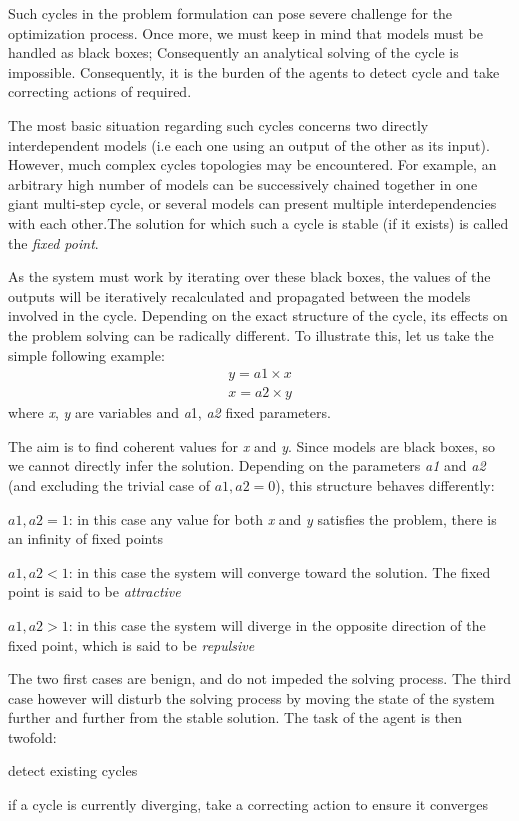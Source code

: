 Such cycles in the problem formulation can pose severe challenge for the optimization process. Once more, we must keep in mind that models must be handled as black boxes; Consequently an analytical solving of the cycle is impossible. Consequently, it is the burden of the agents to detect cycle and take correcting actions of required.

The most basic situation regarding such cycles concerns two directly interdependent models (i.e each one using an output of the other as its input). However, much complex cycles topologies may be encountered. For example, an arbitrary high number of models can be successively chained together in one giant multi-step cycle, or several models can present multiple interdependencies with each other.The solution for which such a cycle is stable (if it exists) is called the \emph{fixed point}.

As the system must work by iterating over these black boxes, the values of the outputs will be iteratively recalculated and propagated between the models involved in the cycle. Depending on the exact structure of the cycle, its effects on the problem solving can be radically different. To illustrate this, let us take the simple following example:
\begin{gather*}
y = a1 \times x \\
x = a2 \times y
\end{gather*}
where \emph{x}, \emph{y} are variables and \emph{a}1, \emph{a2} fixed parameters.
 
The aim is to find coherent values for \emph{x} and \emph{y}. Since models are black boxes, so we cannot directly infer the solution. Depending on the parameters \emph{a1} and \emph{a2} (and excluding the trivial case of \(a1, a2 = 0\)), this structure behaves differently: 
 
\begin{compactitem}
\item \(a1, a2 = 1\): in this case any value for both \emph{x} and \emph{y} satisfies the problem, there is an infinity of fixed points
\item \(a1, a2 < 1\): in this case the system will converge toward the solution. The fixed point is said to be \emph{attractive}
\item \(a1, a2 > 1\): in this case the system will diverge in the opposite direction of the fixed point, which is said to be \emph{repulsive}
\end{compactitem}

The two first cases are benign, and do not impeded the solving process. The third case however will disturb the solving process by moving the state of the system further and further from the stable solution. The task of the agent is then twofold:
\begin{compactenum}
\item detect existing cycles
\item if a cycle is currently diverging, take a correcting action to ensure it converges
\end{compactenum}

